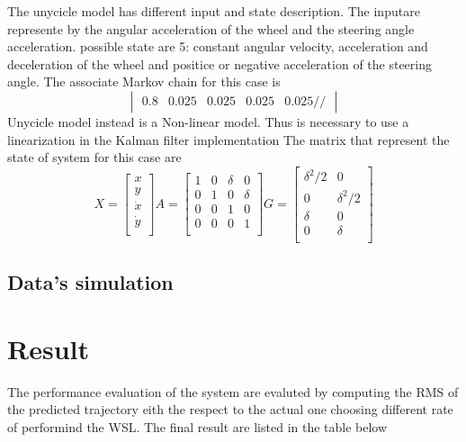 \documentclass{article}
\begin{document}
\begin{multicols}{2}
    The unycicle model has different input and state description. The inputare represente by the angular acceleration of the wheel and the steering angle acceleration.
    possible state are 5: constant angular velocity, acceleration and deceleration of the wheel and positice or negative acceleration of the steering angle.
    The associate Markov chain for this case is
    $$\begin{vmatrix}
            0.8 & 0.025 & 0.025 & 0.025 & 0.025 //
        \end{vmatrix}$$
    Unycicle model instead is a Non-linear model. Thus is necessary to use a linearization in the Kalman filter implementation
    The matrix that represent the state of system for this case are
    \[ X=\begin{bmatrix} x \\ y \\ \dot{x} \\ \dot{y} \\ \end{bmatrix}  A=\begin{bmatrix}
            1 & 0 & \delta & 0      \\
            0 & 1 & 0      & \delta \\
            0 & 0 & 1      & 0      \\
            0 & 0 & 0      & 1      \\
        \end{bmatrix}
        G=\begin{bmatrix}
            \delta^2/2 & 0          \\
            0          & \delta^2/2 \\
            \delta     & 0          \\
            0          & \delta     \\
        \end{bmatrix}
    \]
    \subsection*{Data's simulation}

    \section*{Result}
    The performance evaluation of the system are evaluted by computing the RMS of the predicted trajectory eith the respect to the actual one
    choosing different rate of performind the WSL. The final result are listed in the table below



\end{multicols}
\end{document}
